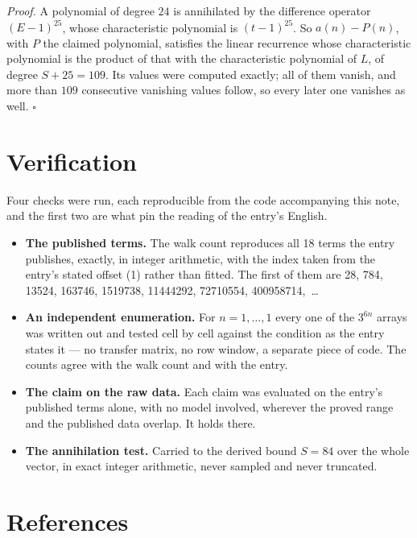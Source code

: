 \documentclass[11pt]{article}
\theoremstyle{definition}
\begin{document}
{\itshape Proof.} A polynomial of degree $24$ is annihilated by the difference operator $(E-1)^{25}$, whose characteristic polynomial is $(t-1)^{25}$. So $a(n) - P(n)$, with $P$ the claimed polynomial, satisfies the linear recurrence whose characteristic polynomial is the product of that with the characteristic polynomial of $L$, of degree $S + 25 = 109$. Its values were computed exactly; all of them vanish, and more than $109$ consecutive vanishing values follow, so every later one vanishes as well. $\square$

\section{Verification}

Four checks were run, each reproducible from the code accompanying this note, and the first two are what pin the reading of the entry's English.

\begin{itemize}

\item {\bfseries The published terms.} The walk count reproduces all 18 terms the entry publishes, exactly, in integer arithmetic, with the index taken from the entry's stated offset (1) rather than fitted. The first of them are 28, 784, 13524, 163746, 1519738, 11444292, 72710554, 400958714,~\dots

\item {\bfseries An independent enumeration.} For $n = 1,\dots,1$ every one of the $3^{6n}$ arrays was written out and tested cell by cell against the condition as the entry states it --- no transfer matrix, no row window, a separate piece of code. The counts agree with the walk count and with the entry.

\item {\bfseries The claim on the raw data.} Each claim was evaluated on the entry's published terms alone, with no model involved, wherever the proved range and the published data overlap. It holds there.

\item {\bfseries The annihilation test.} Carried to the derived bound $S = 84$ over the whole vector, in exact integer arithmetic, never sampled and never truncated.

\end{itemize}

\section{References}
\end{document}
